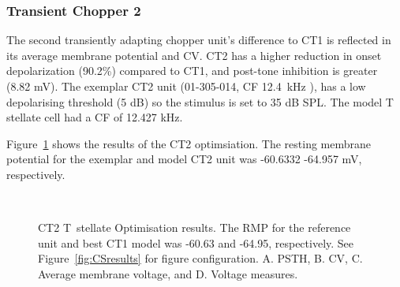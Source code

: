 \clearpage
\subsubsection{Transient Chopper 2}


The second transiently adapting chopper unit's difference to CT1 is reflected in its average membrane potential and CV.
CT2 has a higher reduction in onset depolarization (90.2\%) compared to CT1, and post-tone inhibition is greater (8.82 mV).
The exemplar CT2 unit (01-305-014, CF 12.4~kHz \citep*{PaoliniClareyEtAl:2005}), has a low depolarising threshold (5 dB) so the stimulus is set to 35 dB SPL.
The model T stellate cell had a CF of 12.427 kHz.



Figure~\ref{fig:CT2results} shows the results of the CT2 optimsiation.
The resting membrane potential for the exemplar and model CT2 unit was -60.6332 -64.957 mV, respectively.


\begin{figure}[htb]
  \centering
 \\
  \caption[CT2 T~stellate Optimisation results]{CT2 T~stellate Optimisation
    results.
The RMP for the reference unit and best CT1 model was -60.63 and    -64.95, respectively.
See Figure~\ref{fig:CSresults} for figure     configuration.
A. PSTH, B. CV, C. Average membrane voltage, and D. Voltage     measures.}
  \label{fig:CT2results}
\end{figure}



